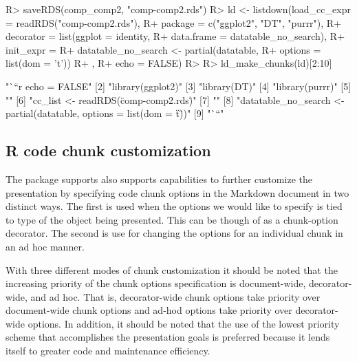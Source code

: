 \documentclass[
]{jss}
\begin{document}
\begin{CodeChunk}

\begin{CodeInput}
R> saveRDS(comp_comp2, "comp-comp2.rds")
R> ld <- listdown(load_cc_expr = readRDS("comp-comp2.rds"),
R+                package = c("ggplot2", "DT", "purrr"),
R+                decorator = list(ggplot = identity,
R+                                 data.frame = datatable_no_search),
R+                init_expr = {
R+                  datatable_no_search <- partial(datatable,
R+                                                 options = list(dom = 't'))
R+                  },
R+                echo = FALSE)
R> 
R> ld_make_chunks(ld)[2:10]
\end{CodeInput}

\begin{CodeOutput}
[1] "```{r echo = FALSE}"                                                   
[2] "library(ggplot2)"                                                      
[3] "library(DT)"                                                           
[4] "library(purrr)"                                                        
[5] ""                                                                      
[6] "cc_list <- readRDS(\"comp-comp2.rds\")"                                
[7] ""                                                                      
[8] "datatable_no_search <- partial(datatable, options = list(dom = \"t\"))"
[9] "```"                                                                   
\end{CodeOutput}
\end{CodeChunk}

\hypertarget{r-code-chunk-customization}{%
\subsection{R code chunk
customization}\label{r-code-chunk-customization}}

The  package supports also supports capabilities to
further customize the presentation by specifying  code chunk
options in the  Markdown document in two distinct ways. The
first is used when the options we would like to specify is tied to type
of the object being presented. This can be though of as a chunk-option
decorator. The second is use for changing the options for an individual
chunk in an ad hoc manner.

With three different modes of chunk customization it should be noted
that the increasing priority of the chunk options specification is
document-wide, decorator-wide, and ad hoc. That is, decorator-wide chunk
options take priority over document-wide chunk options and ad-hod
options take priority over decorator-wide options. In addition, it
should be noted that the use of the lowest priority scheme that
accomplishes the presentation goals is preferred because it lends itself
to greater code and maintenance efficiency.
\end{document}
